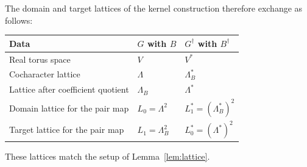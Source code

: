 \documentclass[11pt,a4paper,reqno]{amsart}
\theoremstyle{plain}
\theoremstyle{definition}
\theoremstyle{remark}
\numberwithin{equation}{section}
\begin{document}
The domain and target lattices of the kernel construction therefore exchange as follows:
\begin{center}
\begin{tabular}{lll}
\toprule
Data & $G$ with $B$ & $G^\dagger$ with $B^\dagger$\\
\midrule
Real torus space & $V$ & $V^*$\\
Cocharacter lattice & $\Lambda$ & $\Lambda_B^*$\\
Lattice after coefficient quotient & $\Lambda_B$ & $\Lambda^*$\\
Domain lattice for the pair map & $L_0=\Lambda^2$ & $L_1^*=(\Lambda_B^*)^2$\\
Target lattice for the pair map & $L_1=\Lambda_B^2$ & $L_0^*=(\Lambda^*)^2$\\
\bottomrule
\end{tabular}
\end{center}
These lattices match the setup of Lemma~\ref{lem:lattice}.
\end{document}

